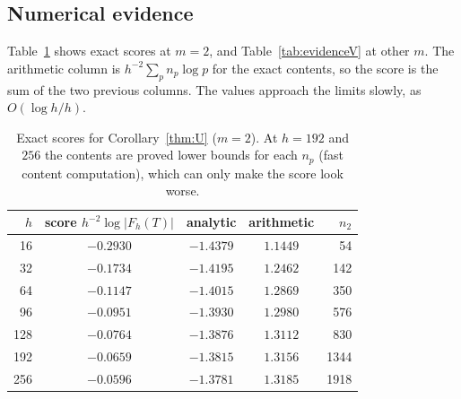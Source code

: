 \documentclass[11pt]{amsart}
\theoremstyle{definition}
\theoremstyle{remark}
\numberwithin{equation}{section}
\begin{document}
\subsection{Numerical evidence}
Table~\ref{tab:evidence} shows exact scores at $m=2$, and Table~\ref{tab:evidenceV} at other $m$. The arithmetic column
is $h^{-2}\sum_pn_p\log p$ for the exact contents, so the score is the sum of the two previous columns. The values approach
the limits slowly, as $O(\log h/h)$.

\begin{table}[ht]
\centering
\begin{tabular}{@{}rcccr@{}}
\toprule
$h$ & score $h^{-2}\log|F_h(T)|$ & analytic & arithmetic & $n_2$\\
\midrule
16 & $-0.2930$ & $-1.4379$ & $1.1449$ & 54\\
32 & $-0.1734$ & $-1.4195$ & $1.2462$ & 142\\
64 & $-0.1147$ & $-1.4015$ & $1.2869$ & 350\\
96 & $-0.0951$ & $-1.3930$ & $1.2980$ & 576\\
128 & $-0.0764$ & $-1.3876$ & $1.3112$ & 830\\
192 & $-0.0659$ & $-1.3815$ & $1.3156$ & 1344\\
256 & $-0.0596$ & $-1.3781$ & $1.3185$ & 1918\\
\bottomrule
\end{tabular}
\caption{Exact scores for Corollary~\ref{thm:U} ($m=2$). At $h=192$ and $256$ the contents are proved lower bounds for
each $n_p$ (fast content computation), which can only make the score look worse.}\label{tab:evidence}
\end{table}
\end{document}
